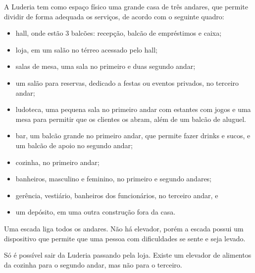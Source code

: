 A Luderia tem como espaço físico uma grande casa de três andares, que permite dividir de forma adequada os serviços, de acordo com o seguinte quadro:
\begin{itemize}
    \item hall, onde estão 3 balcões: recepção, balcão de empréstimos e caixa;
    \item loja, em um salão no térreo acessado pelo hall;
    \item salas de mesa, uma sala no primeiro e duas segundo andar;
    \item um salão para reservas, dedicado a festas ou eventos privados, no terceiro andar;
    \item ludoteca, uma pequena sala no primeiro andar com estantes com jogos e uma mesa para permitir que os clientes os abram, além de um balcão de aluguel. 
    \item bar, um balcão grande no primeiro andar, que permite fazer drinks e sucos, e um balcão de apoio no segundo andar;
    \item cozinha, no primeiro andar;
    \item banheiros, masculino e feminino, no primeiro e segundo andares;
    \item gerência, vestiário, banheiros dos funcionários, no terceiro andar, e 
    \item um depósito, em uma outra construção fora da casa.
    \end{itemize}

Uma escada liga todos os andares. Não há elevador, porém a escada possui um dispositivo que permite que uma pessoa com dificuldades se sente e seja levado.

Só é possível sair da Luderia passando pela loja. Existe um elevador de alimentos da cozinha para o segundo andar, mas não para o terceiro.

